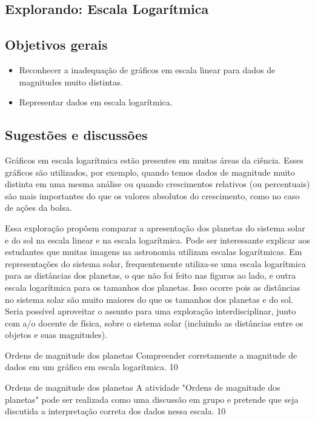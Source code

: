 \clearpage
\def\currentcolor{session1}
\begin{texto}
{
\section{Explorando: Escala Logarítmica}
\subsection{Objetivos gerais}
\begin{itemize}
\item Reconhecer a inadequação de gráficos em escala linear para dados de magnitudes muito distintas.
\item Representar dados em escala logarítmica.
\end{itemize}
\subsection{Sugestões e discussões}
Gráficos em escala logarítmica estão presentes em muitas áreas da ciência. Esses gráficos são utilizados, por exemplo, quando temos dados de magnitude muito distinta em uma mesma análise ou quando crescimentos relativos (ou percentuais) são mais importantes do que os valores absolutos do crescimento, como no caso de ações da bolsa. 

Essa exploração propõem comparar a apresentação dos planetas do sistema solar e do sol na escala linear e na escala logarítmica. Pode ser interessante explicar aos estudantes que muitas imagens na astronomia utilizam escalas logarítmicas. Em representações do sistema solar, frequentemente utiliza-se uma escala logarítmica para as distâncias dos planetas, o que não foi feito nas figuras ao lado, e outra escala logarítmica para os tamanhos dos planetas. Isso ocorre pois as distâncias no sistema solar são muito maiores do que os tamanhos dos planetas e do sol. Seria possível aproveitar o assunto para uma exploração interdisciplinar, junto com a/o docente de física, sobre o sistema solar (incluindo as distâncias entre os objetos e suas magnitudes).
}
\end{texto}
\clearmargin
\begin{objectives}{Ordens de magnitude dos planetas}
{
	Compreender corretamente a magnitude de dados em um gráfico em escala logarítmica.
}{1}{0}
\end{objectives}
\begin{sugestions}{Ordens de magnitude dos planetas}
{
	A atividade "Ordens de magnitude dos planetas" pode ser realizada como uma discussão em grupo e pretende que seja discutida a interpretação correta dos dados nessa escala.
}{1}{0}
\end{sugestions}
